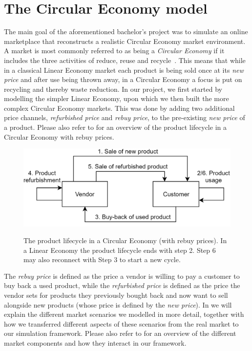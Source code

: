\clearpage
\section{The Circular Economy model}\label{sec:CircularEconomy}

The main goal of the aforementioned bachelor's project was to simulate an online marketplace that reconstructs a realistic Circular Economy market environment. A market is most commonly referred to as being a \emph{Circular Economy} if it includes the three activities of reduce, reuse and recycle~\cite{circularEconomyDefinition}. This means that while in a classical Linear Economy market each product is being sold once at its \emph{new price} and after use being thrown away, in a Circular Economy a focus is put on recycling and thereby waste reduction. In our project, we first started by modelling the simpler Linear Economy, upon which we then built the more complex Circular Economy markets. This was done by adding two additional price channels, \emph{refurbished price} and \emph{rebuy price}, to the pre-existing \emph{new price} of a product. Please also refer to  for an overview of the product lifecycle in a Circular Economy with rebuy prices.

\begin{figure}[t]
	\centering
	\includegraphics[width = \textwidth]{images/product_lifecycle.png}\\
	\caption{The product lifecycle in a Circular Economy (with rebuy prices). In a Linear Economy the product lifecycle ends with step 2. Step 6 may also reconnect with Step 3 to start a new cycle.\\ }\label{fig:IntroMarketDynamics}
\end{figure}

The \emph{rebuy price} is defined as the price a vendor is willing to pay a customer to buy back a used product, while the \emph{refurbished price} is defined as the price the vendor sets for products they previously bought back and now want to sell alongside new products (whose price is defined by the \emph{new price}). In  we will explain the different market scenarios we modelled in more detail, together with how we transferred different aspects of these scenarios from the real market to our simulation framework. Please also refer to  for an overview of the different market components and how they interact in our framework.

